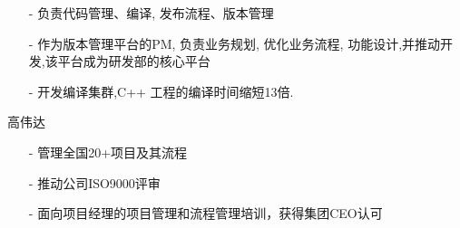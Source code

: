 \documentclass[11pt,a4paper]{moderncv}
\begin{document}
\vspace{1ex}  
\vspace*{0.2\baselineskip}
{
  \begin{itemize}
    \item[-]负责代码管理、编译, 发布流程、版本管理
	\vspace{1ex}  
    \item[-]作为版本管理平台的PM, 负责业务规划, 优化业务流程, 功能设计,并推动开发,该平台成为研发部的核心平台 
\vspace{1ex}  
    \item[-]开发编译集群,C++ 工程的编译时间缩短13倍.
  \end{itemize}
}

\vspace{2ex}  
	{高伟达}{}{}{}{}
	
{
\begin{itemize}
    \item[-] 管理全国20+项目及其流程
	\vspace{1ex}  
    \item[-] 推动公司ISO9000评审
	\vspace{1ex}  
    \item[-] 面向项目经理的项目管理和流程管理培训，获得集团CEO认可
  \end{itemize}
}

\end{document}
